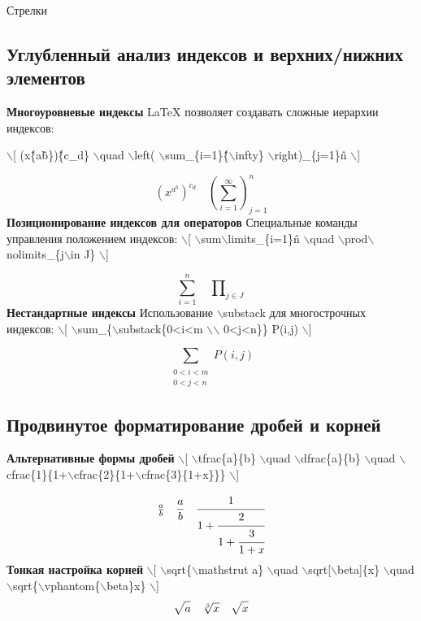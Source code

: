 \documentclass[a4paper, 14pt]{extarticle}
\newcommand{\n}{\par}
\begin{document}
	Стрелки
	
	\subsection*{Углубленный анализ индексов и верхних/нижних элементов}
	\textbf{Многоуровневые индексы} 
	\LaTeX{} позволяет создавать сложные иерархии индексов:\n
	$\backslash$[ (x\^\{a\^b\})\^\{c\_d\} $\backslash$quad $\backslash$left( $\backslash$sum\_\{i=1\}\^\{$\backslash$infty\} $\backslash$right)\_\{j=1\}\^n $\backslash$]
	
	\[ (x^{a^b})^{c_d} \quad \left( \sum_{i=1}^{\infty} \right)_{j=1}^n \]
	\textbf{Позиционирование индексов для операторов}
	Специальные команды управления положением индексов:
	$\backslash$[ $\backslash$sum$\backslash$limits\_\{i=1\}\^n $\backslash$quad $\backslash$prod$\backslash$nolimits\_\{j$\backslash$in J\} $\backslash$]
	
	\[ \sum\limits_{i=1}^n \quad \prod\nolimits_{j\in J} \]
	\textbf{Нестандартные индексы}
	Использование $\backslash$substack для многострочных индексов:
	$\backslash$[ $\backslash$sum\_\{$\backslash$substack\{0<i<m $\backslash$$\backslash$ 0<j<n\}\} P(i,j) $\backslash$]
	
	\[ \sum_{\substack{0<i<m \\ 0<j<n}} P(i,j) \]
	\subsection*{Продвинутое форматирование дробей и корней}
	\textbf{Альтернативные формы дробей}
	$\backslash$[ $\backslash$tfrac\{a\}\{b\} $\backslash$quad $\backslash$dfrac\{a\}\{b\} $\backslash$quad $\backslash$cfrac\{1\}\{1+$\backslash$cfrac\{2\}\{1+$\backslash$cfrac\{3\}\{1+x\}\}\} $\backslash$]
	
	\[ \tfrac{a}{b} \quad \dfrac{a}{b} \quad \cfrac{1}{1+\cfrac{2}{1+\cfrac{3}{1+x}}} \]
	\textbf{Тонкая настройка корней} 
	$\backslash$[ $\backslash$sqrt\{$\backslash$mathstrut a\} $\backslash$quad $\backslash$sqrt[$\backslash$beta]\{x\} $\backslash$quad $\backslash$sqrt\{$\backslash$vphantom\{$\backslash$beta\}x\} $\backslash$]	
	\[ \sqrt{\mathstrut a} \quad \sqrt[\beta]{x} \quad \sqrt{\vphantom{\beta}x} \]
\end{document}
